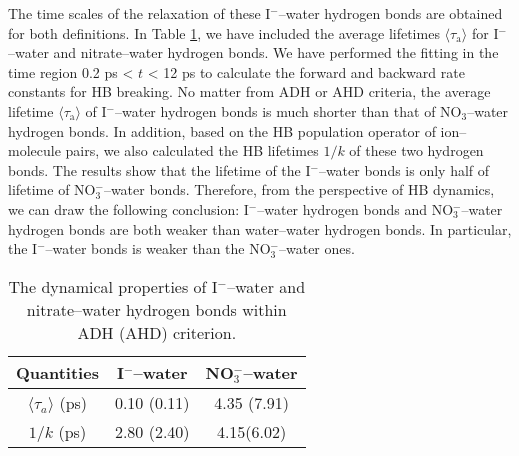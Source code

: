 The time scales of the relaxation of these I$^-$--water hydrogen bonds are obtained for both definitions. 
In Table \ref{tab:properties_anion-water_hbs}, we have included the average lifetimes $\langle\tau_\text{a}\rangle$ for I$^-$--water and nitrate--water hydrogen bonds. 
We have performed the fitting in the time region 0.2 ps < $t$ < 12 ps to calculate the forward and backward rate constants for HB breaking.
No matter from ADH or AHD criteria, the average lifetime $\langle\tau_\text{a}\rangle$ of I$^-$--water hydrogen bonds is much shorter than that of NO$_3$--water hydrogen bonds.
In addition, based on the HB population operator of ion--molecule pairs, we also calculated the HB lifetimes $1/k$ of these two hydrogen bonds. 
The results show that the lifetime of the I$^-$--water bonds is only half of lifetime of NO$_3^-$--water bonds. Therefore, from the perspective of HB dynamics,
we can draw the following conclusion: I$^-$--water hydrogen bonds and NO$_3^-$--water hydrogen bonds are both weaker than water--water hydrogen bonds. In particular, 
the I$^-$--water bonds is weaker than the NO$_3^-$--water ones.
\begin{table}[htbp]
\centering
\caption{ 
    The dynamical properties of I$^-$--water and nitrate--water hydrogen bonds within ADH (AHD) criterion.} 
\begin{tabular}{ccc}
\label{tab:properties_anion-water_hbs}
 Quantities  & I$^-$--water & NO$_3^-$--water \\
\hline
  $\langle\tau_a\rangle$ (ps) & 0.10 (0.11) & 4.35 (7.91) \\
  $1/k$ (ps) & 2.80 (2.40) & 4.15(6.02) \\
\end{tabular} %
\end{table}
%
%

